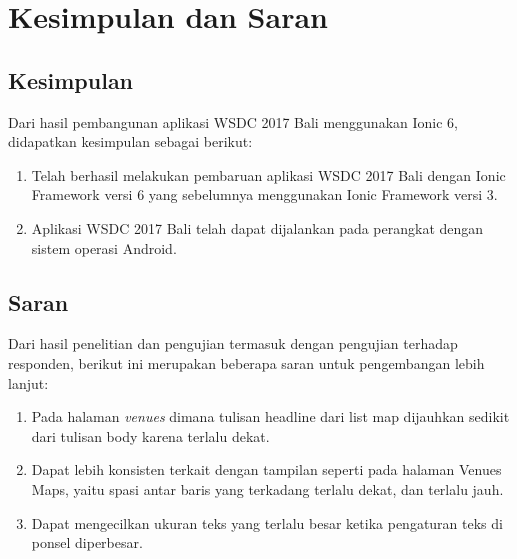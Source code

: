 \chapter{Kesimpulan dan Saran}
\label{chap:kesimpulanSaran}

\section{Kesimpulan} 
\label{sec:kesimpulan}

Dari hasil pembangunan aplikasi WSDC 2017 Bali menggunakan Ionic 6, didapatkan kesimpulan sebagai berikut:

\begin{enumerate}
	\item Telah berhasil melakukan pembaruan aplikasi WSDC 2017 Bali dengan Ionic Framework versi 6 yang sebelumnya menggunakan Ionic Framework versi 3.
	\item Aplikasi WSDC 2017 Bali telah dapat dijalankan pada perangkat dengan sistem operasi Android.
\end{enumerate}

\section{Saran} 
\label{sec:saran}

Dari hasil penelitian dan pengujian termasuk dengan pengujian terhadap responden, berikut ini merupakan beberapa saran untuk pengembangan lebih lanjut:

\begin{enumerate}
	\item Pada halaman \textit{venues} dimana tulisan headline dari list map dijauhkan sedikit dari tulisan body karena terlalu dekat.
	\item Dapat lebih konsisten terkait dengan tampilan seperti pada halaman Venues Maps, yaitu spasi antar baris yang terkadang terlalu dekat, dan terlalu jauh.
	\item Dapat mengecilkan ukuran teks yang terlalu besar ketika pengaturan teks di ponsel diperbesar.
\end{enumerate}